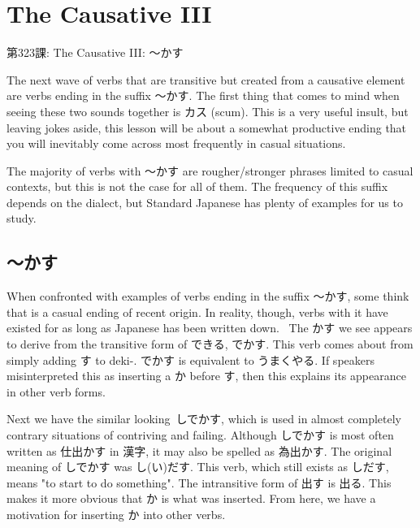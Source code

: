     
\chapter{The Causative III}

\begin{center}
\begin{Large}
第323課: The Causative III: ～かす 
\end{Large}
\end{center}
 
\par{ The next wave of verbs that are transitive but created from a causative element are verbs ending in the suffix ～かす. The first thing that comes to mind when seeing these two sounds together is カス (scum). This is a very useful insult, but leaving jokes aside, this lesson will be about a somewhat productive ending that you will inevitably come across most frequently in casual situations. }

\par{ The majority of verbs with ～かす are rougher\slash stronger phrases limited to casual contexts, but this is not the case for all of them. The frequency of this suffix depends on the dialect, but Standard Japanese has plenty of examples for us to study. }
      
\section{～かす}
 
\par{ When confronted with examples of verbs ending in the suffix ～かす, some think that is a casual ending of recent origin. In reality, though, verbs with it have existed for as long as Japanese has been written down.  The かす we see appears to derive from the transitive form of できる, でかす. This verb comes about from simply adding す to deki-. でかす is equivalent to うまくやる. If speakers misinterpreted this as inserting a か before す, then this explains its appearance in other verb forms. }

\par{ Next we have the similar looking しでかす, which is used in almost completely contrary situations of contriving and failing. Although しでかす is most often written as 仕出かす in 漢字, it may also be spelled as 為出かす. The original meaning of しでかす was し(い)だす. This verb, which still exists as しだす, means "to start to do something". The intransitive form of 出す is 出る. This makes it more obvious that か is what was inserted. From here, we have a motivation for inserting か into other verbs. }


